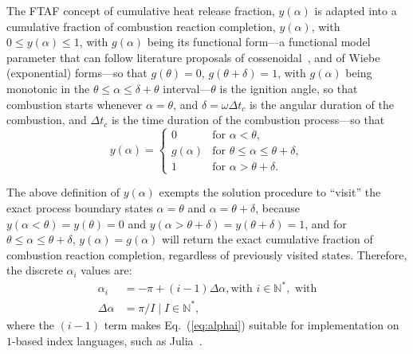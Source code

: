     The FTAF concept of cumulative heat release fraction, $y(\alpha)$ is adapted into a cumulative fraction  of  combustion  reaction  completion,  $y(\alpha)$,  with  $0  \leqslant  y(\alpha)
    \leqslant 1$, with $g(\alpha)$ being its functional form---a functional model parameter that can follow literature proposals of  cossenoidal~\cite{2008-CurtoRissoPL+HernandezAC-JApplPhys},
    and of Wiebe~\cite{2013-MartinsJJG-Publindustria} (exponential) forms---so that $g(\theta) = 0$, $g(\theta+\delta) = 1$, with $g(\alpha)$ being monotonic in the  $\theta  \leqslant  \alpha
    \leqslant \delta + \theta$ interval---$\theta$ is the ignition angle, so that combustion starts whenever $\alpha = \theta$, and $\delta = \omega\Delta t_c$ is the angular duration  of  the
    combustion, and $\Delta t_c$ is the time duration of the combustion process---so that%
    \begin{equation}
        y(\alpha) =
        \begin{cases}
            0         & \text{for } \alpha < \theta, \\
            g(\alpha) & \text{for } \theta \leqslant \alpha \leqslant \theta + \delta, \\
            1         & \text{for } \alpha > \theta + \delta.
        \end{cases}
        \label{def:y}
    \end{equation}

    The above definition of $y(\alpha)$ exempts the solution procedure to ``visit'' the exact process boundary states $\alpha = \theta$ and $\alpha = \theta  +  \delta$,  because  $y(\alpha  <
    \theta) = y(\theta) = 0$ and $y(\alpha > \theta + \delta) = y(\theta + \delta) = 1$, and for $\theta \leqslant \alpha \leqslant \theta + \delta$, $y(\alpha) = g(\alpha)$  will  return  the
    exact cumulative fraction of combustion reaction completion, regardless of previously visited states. Therefore, the discrete $\alpha_i$ values are:%
    \begin{align}
        \label{eq:alphai}
        \alpha_i        &= -\pi + (i - 1)\Delta\alpha, \mbox{with $i \in \mathbb{N}^*,$ with} \\
        \label{eq:dAlpha}
        \Delta\alpha    &= \pi / I \;|\; I \in \mathbb{N}^*,
    \end{align}
    \noindent  where  the  $(i  -  1)$  term  makes  Eq.~(\ref{eq:alphai})  suitable  for  implementation  on  $1$-based  index  languages,  such  as  Julia~\cite{2012-BezansonJ+EdelmanA-CoRR,
    2017-BezansonJ+ShahVB-SIAMRev}.

